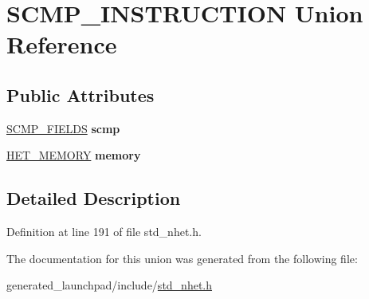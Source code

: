 \hypertarget{unionSCMP__INSTRUCTION}{}\section{S\+C\+M\+P\+\_\+\+I\+N\+S\+T\+R\+U\+C\+T\+I\+ON Union Reference}
\label{unionSCMP__INSTRUCTION}
\subsection*{Public Attributes}
\begin{DoxyCompactItemize}
\item 
\mbox{\label{unionSCMP__INSTRUCTION_ae0bfdf555d0c67ab2c0600dee9d663e0}} 
\mbox{\hyperlink{structscmp__format}{S\+C\+M\+P\+\_\+\+F\+I\+E\+L\+DS}} {\bfseries scmp}
\item 
\mbox{\label{unionSCMP__INSTRUCTION_a4aeb7a8159ab3a364b212a9627fff07b}} 
\mbox{\hyperlink{structmemory__format}{H\+E\+T\+\_\+\+M\+E\+M\+O\+RY}} {\bfseries memory}
\end{DoxyCompactItemize}


\subsection{Detailed Description}


Definition at line 191 of file std\+\_\+nhet.\+h.



The documentation for this union was generated from the following file\+:\begin{DoxyCompactItemize}
\item 
generated\+\_\+launchpad/include/\mbox{\hyperlink{std__nhet_8h}{std\+\_\+nhet.\+h}}\end{DoxyCompactItemize}
